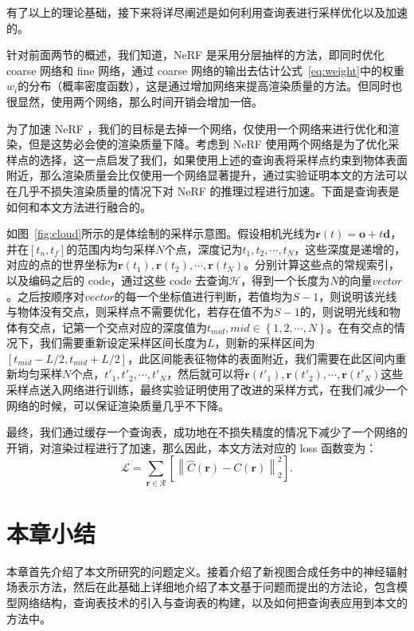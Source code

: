 有了以上的理论基础，接下来将详尽阐述是如何利用查询表进行采样优化以及加速的。

针对前面两节的概述，我们知道，NeRF 是采用分层抽样的方法，即同时优化 coarse 网络和 fine 网络，通过 coarse 网络的输出去估计公式~\ref{eq:weight}中的权重$\displaystyle w_i$的分布（概率密度函数），这是通过增加网络来提高渲染质量的方法。但同时也很显然，使用两个网络，那么时间开销会增加一倍。

为了加速 NeRF ，我们的目标是去掉一个网络，仅使用一个网络来进行优化和渲染，但是这势必会使的渲染质量下降。考虑到 NeRF 使用两个网络是为了优化采样点的选择，这一点启发了我们，如果使用上述的查询表将采样点约束到物体表面附近，那么渲染质量会比仅使用一个网络显著提升，通过实验证明本文的方法可以在几乎不损失渲染质量的情况下对 NeRF 的推理过程进行加速。下面是查询表是如何和本文方法进行融合的。

如图~\ref{fig:cloud}所示的是体绘制的采样示意图。假设相机光线为$\symbf{r}\left(t\right) = \symbf{o} + t \symbf{d}$，并在$\left[t_n, t_f\right]$的范围内均匀采样$N$个点，深度记为$t_{1}, t_{2}, \cdots, t_{N}$，这些深度是递增的，对应的点的世界坐标为$\symbf{r}\left(t_{1}\right), \symbf{r}\left(t_{2}\right), \cdots, \symbf{r}\left(t_{N}\right)$。分别计算这些点的常规索引，以及编码之后的 code，通过这些 code 去查询$\mathcal{H}$，得到一个长度为$N$的向量$vector$。之后按顺序对$vector$的每一个坐标值进行判断，若值均为$S - 1$，则说明该光线与物体没有交点，则采样点不需要优化，若存在值不为$S - 1$的，则说明光线和物体有交点，记第一个交点对应的深度值为$t_{mid}, mid \in \left\{1, 2, \cdots, N\right\}$。在有交点的情况下，我们需要重新设定采样区间长度为$L$，则新的采样区间为$\left[t_{mid} - L / 2, t_{mid} + L / 2\right]$，此区间能表征物体的表面附近，我们需要在此区间内重新均匀采样$N$个点，${t\prime}_{1}, {t\prime}_{2}, \cdots, {t\prime}_{N}$，然后就可以将$\symbf{r}\left(t\prime_{1}\right), \symbf{r}\left(t\prime_{2}\right), \cdots, \symbf{r}\left(t\prime_{N}\right)$这些采样点送入网络进行训练，最终实验证明使用了改进的采样方式，在我们减少一个网络的时候，可以保证渲染质量几乎不下降。

最终，我们通过缓存一个查询表，成功地在不损失精度的情况下减少了一个网络的开销，对渲染过程进行了加速，那么因此，本文方法对应的 loss 函数变为：
\begin{equation}
    \mathcal{L} = \sum_{\symbf{r}\in \mathcal{R}}\left[\left\|\hat{C}\left(\symbf{r}\right) - C\left(\symbf{r}\right)\right\|_{2}^{2} \right].
    \label{eq:nerf_loss}
\end{equation}

\section{本章小结}
本章首先介绍了本文所研究的问题定义。接着介绍了新视图合成任务中的神经辐射场表示方法，然后在此基础上详细地介绍了本文基于问题而提出的方法论，包含模型网络结构，查询表技术的引入与查询表的构建，以及如何把查询表应用到本文的方法中。

